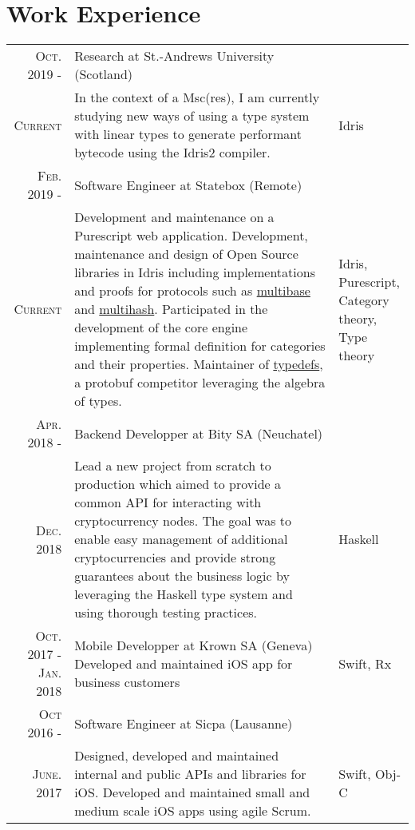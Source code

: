\documentclass[a4paper,10pt]{article} %
\begin{document}
\section{Work Experience}
\renewcommand{\arraystretch}{1.3}
\begin{tabular}{r|p{9.3cm}|l}
\textsc{Oct. 2019 -} & Research at St.-Andrews University (Scotland) & \\
\textsc{Current} & \footnotesize{In the context of a Msc(res), I am currently studying new ways of using a type system with linear types
 to generate performant bytecode using the Idris2 compiler.} & Idris \\
\textsc{Feb. 2019 -} & Software Engineer at Statebox (Remote) & \\
\textsc{Current} & \footnotesize{Development and maintenance on a Purescript
web application. Development, maintenance and design of Open Source
libraries in Idris including implementations and proofs for 
protocols such as \href{https://github.com/multiformats/multibase}{multibase}
and \href{https://www.github.com/multiformats/multihash}{multihash}. 
Participated in the development of the core engine implementing
formal definition for categories and their properties. 
Maintainer of \href{http://typedefs.com}{typedefs}, a 
protobuf competitor leveraging the algebra of types.}& \makecell[tl]{Idris, Purescript,\\Category theory,\\Type theory}\\
\textsc{Apr. 2018 -} & Backend Developper at Bity SA (Neuchatel) & \\
\textsc{Dec. 2018} & \footnotesize{Lead a new project from scratch to production which aimed to provide a common API for interacting with cryptocurrency nodes. The goal was to enable easy management of additional cryptocurrencies and provide strong guarantees about the business logic by leveraging the Haskell type system and using thorough testing practices.} & Haskell\\

\makecell[cr]{
	\textsc{Oct. 2017 -} \\
	\textsc{Jan. 2018}
	} & \makecell[cl]{Mobile Developper at Krown SA (Geneva)\\
	    \footnotesize{Developed and maintained iOS app for business customers}}& Swift, Rx\\

\textsc{Oct 2016 -} & Software Engineer at Sicpa (Lausanne)\\

\textsc{June. 2017}  
& \footnotesize{Designed, developed and maintained internal and public APIs and libraries for iOS. Developed and maintained small and medium scale iOS apps using agile Scrum.} 
& Swift, Obj-C\\



\end{tabular}
\end{document}
